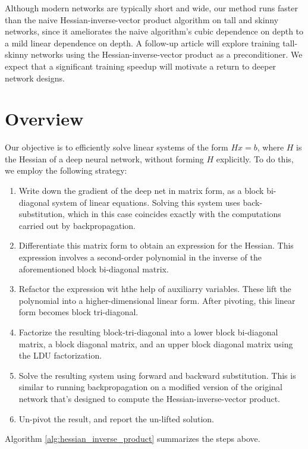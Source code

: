 \documentclass{article}
\begin{document}
Although modern networks are typically short and wide, our method runs faster
than the naive Hessian-inverse-vector product algorithm on tall and skinny
networks, since it ameliorates the naive algorithm's cubic dependence on depth
to a mild linear dependence on depth.  A follow-up article will explore training
tall-skinny networks using the Hessian-inverse-vector product as a
preconditioner.  We expect that a significant training speedup will motivate a
return to deeper network designs.


\section{Overview}

Our objective is to efficiently solve linear systems of the form $H x = b$,
where $H$ is the Hessian of a deep neural network, without forming $H$
explicitly. To do this, we employ the following strategy:
\begin{enumerate}
  \item
        Write down the gradient of the deep net in matrix form, as a block bi-diagonal system of linear
        equations. Solving this system uses back-substitution, which in this case
        coincides exactly with the computations carried out by backpropagation.
  \item
        Differentiate this matrix form to obtain an expression for the Hessian. This expression
        involves a second-order polynomial in the inverse of the aforementioned block bi-diagonal matrix.
  \item
        Refactor the expression wit hthe help of auxiliarry variables. These
        lift the polynomial into a higher-dimensional linear form. After
        pivoting, this linear form becomes block tri-diagonal.
  \item
        Factorize the resulting block-tri-diagonal into a lower block
        bi-diagonal matrix, a block diagonal matrix, and an upper block diagonal
        matrix using the LDU factorization.
  \item Solve the resulting system using forward and backward substitution.
        This is similar to running backpropagation on a modified version of the
        original network that's designed to compute the Hessian-inverse-vector
        product.
  \item Un-pivot the result, and report the un-lifted solution.
\end{enumerate}

Algorithm \ref{alg:hessian_inverse_product} summarizes the steps above.
\end{document}
